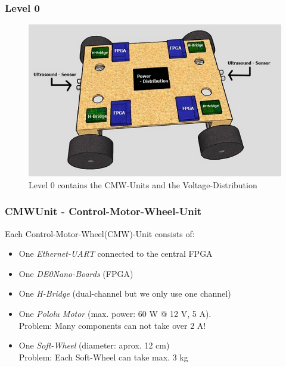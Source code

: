 \documentclass{beamer}
\begin{document}
\begin{frame}
	\frametitle{Level 0}
	\begin{figure}
	\includegraphics[scale=0.7]{figures/level0_b.jpg}
	\caption{Level 0 contains the CMW-Units and the Voltage-Distribution}
	\end{figure}
\end{frame}

\begin{frame}
	\frametitle{CMWUnit - Control-Motor-Wheel-Unit}
	Each Control-Motor-Wheel(CMW)-Unit consists of:
	\begin{itemize}	
		\item One \textit{Ethernet-UART} connected to the central FPGA
	
		\item One \textit{DE0Nano-Boards} (FPGA)
		
		\item One \textit{H-Bridge}	(dual-channel but we only use one channel)
	
		\item One \textit{Pololu Motor} (max. power: 60 W @ 12 V, 5 A).\\
		Problem: Many components can not take over 2 A! 
		
		\item One \textit{Soft-Wheel} (diameter: aprox. 12 cm)\\
		Problem: Each Soft-Wheel can take max. 3 kg 
	\end{itemize}
\end{frame}
\end{document}
